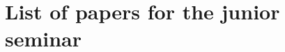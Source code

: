 \documentclass[A4paper, 12pt]{article}
\begin{document}
\section*{List of papers for the junior seminar}

\begin{itemize}
  
\end{itemize}
\end{document}
